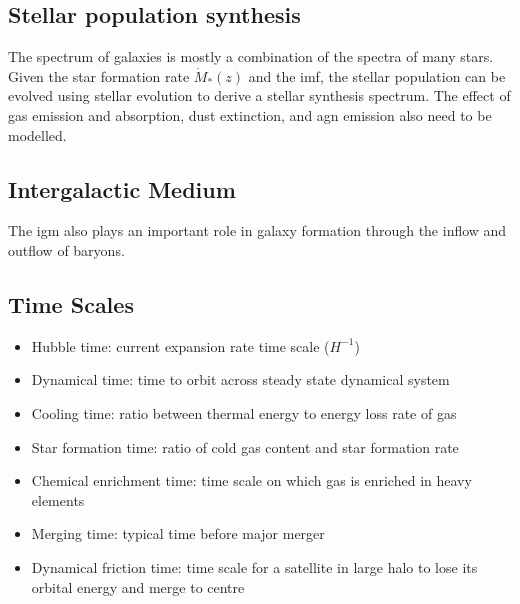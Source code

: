 \subsection{Stellar population synthesis}
The spectrum of galaxies is mostly a combination of the spectra of many stars. Given the star formation rate $\dot{M}_{*}(z)$ and the \ac{imf}, the stellar population can be evolved using stellar evolution to derive a stellar synthesis spectrum. The effect of gas emission and absorption, dust extinction, and \ac{agn} emission also need to be modelled.


\subsection{Intergalactic Medium}

The \ac{igm} also plays an important role in galaxy formation through the inflow and outflow of baryons.




\subsection{Time Scales}
\begin{itemize}
	\item Hubble time: current expansion rate time scale ($H^{-1}$)
	\item Dynamical time: time to orbit across steady state dynamical system
	\item Cooling time: ratio between thermal energy to energy loss rate of gas
	\item Star formation time: ratio of cold gas content and star formation rate
	\item Chemical enrichment time: time scale on which gas is enriched in heavy elements
	\item Merging time: typical time before major merger
	\item Dynamical friction time: time scale for a satellite in large halo to lose its orbital energy and merge to centre
\end{itemize}


